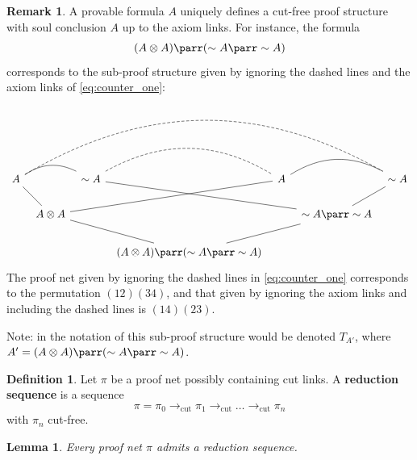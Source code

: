 \documentclass[12pt]{article}
\theoremstyle{plain}
\newtheorem{lemma}[thm]{Lemma}
\theoremstyle{definition}
\newtheorem{defn}[thm]{Definition} %
\newtheorem{remark}[thm]{Remark}
\newcommand{\lto}{\longrightarrow}
\newcommand{\negation}{\sim}
\begin{document}
	\begin{remark}
		A provable formula $A$ uniquely defines a cut-free proof structure with soul conclusion $A$ up to the axiom links. For instance, the formula 
		\begin{equation}
			(A \otimes A) \parr (\negation A \parr \negation A)
		\end{equation}
		corresponds to the sub-proof structure given by ignoring the dashed lines and the axiom links of \eqref{eq:counter_one}:
		\begin{equation}\label{eq:counter_one}
			\begin{tikzcd}[column sep = tiny]
				A \arrow[rr,dash, bend left] \arrow[rd,dash]\arrow[rrrrrr,bend left,dash,dashed] &                         & \negation A \arrow[rr,dash,bend left, dashed] \arrow[rrrd,dash] &                                                     & A \arrow[rr,dash, bend left] \arrow[llld,dash] &                                           & \negation A \arrow[ld,dash] \\
				& A \otimes A \arrow[rrd,dash] &                        &                                                     &                                    & \negation A \parr \negation A \arrow[lld,dash] &                        \\
				&                         &                        & (A \otimes A) \parr (\negation A \parr \negation A) &                                    &                                           &                       
			\end{tikzcd}
		\end{equation}
		The proof net given by ignoring the dashed lines in \eqref{eq:counter_one} corresponds to the permutation $(12)(34)$, and that given by ignoring the axiom links and including the dashed lines is $(14)(23)$.
		
		Note: in the notation of \cite{multiplicatives} this sub-proof structure would be denoted $T_{A'}$, where $A' = (A \otimes A) \parr (\negation A \parr \negation A)$.
	\end{remark}
	\begin{defn}
		Let $\pi$ be a proof net possibly containing cut links. A \textbf{reduction sequence} is a sequence
		\begin{equation}
			\pi = \pi_0 \lto_{\operatorname{cut}} \pi_1 \lto_{\operatorname{cut}} \hdots \lto_{\operatorname{cut}} \pi_n
		\end{equation}
		with $\pi_n$ cut-free.
	\end{defn}
	\begin{lemma}\label{lem:red_sequence_existence}
		Every proof net $\pi$ admits a reduction sequence.
	\end{lemma}
\end{document}

